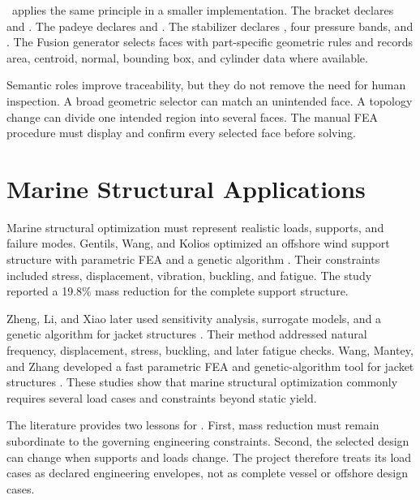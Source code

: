 \NEMO\ applies the same principle in a smaller implementation. The bracket
declares  and . The padeye declares
 and . The stabilizer declares
, four pressure bands, and . The
Fusion generator selects faces with part-specific geometric rules and records
area, centroid, normal, bounding box, and cylinder data where available.

Semantic roles improve traceability, but they do not remove the need for human
inspection. A broad geometric selector can match an unintended face. A
topology change can divide one intended region into several faces. The manual
FEA procedure must display and confirm every selected face before solving.

\section{Marine Structural Applications}
\label{sec:marine-optimization-review}

Marine structural optimization must represent realistic loads, supports, and
failure modes. Gentils, Wang, and Kolios optimized an offshore wind support
structure with parametric FEA and a genetic algorithm
\cite{gentils2017}. Their constraints included stress, displacement,
vibration, buckling, and fatigue. The study reported a 19.8\% mass reduction
for the complete support structure.

Zheng, Li, and Xiao later used sensitivity analysis, surrogate models, and a
genetic algorithm for jacket structures \cite{zheng2023}. Their method
addressed natural frequency, displacement, stress, buckling, and later fatigue
checks. Wang, Mantey, and Zhang developed a fast parametric FEA and
genetic-algorithm tool for jacket structures \cite{wang2024}. These studies
show that marine structural optimization commonly requires several load cases
and constraints beyond static yield.

The literature provides two lessons for \NEMO. First, mass reduction must
remain subordinate to the governing engineering constraints. Second, the
selected design can change when supports and loads change. The project
therefore treats its load cases as declared engineering envelopes, not as
complete vessel or offshore design cases.


